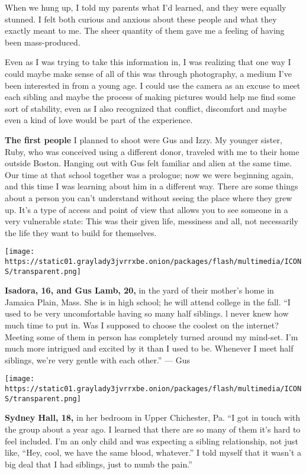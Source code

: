 When we hung up, I told my parents what I'd learned, and they were
equally stunned. I felt both curious and anxious about these people and
what they exactly meant to me. The sheer quantity of them gave me a
feeling of having been mass-produced.

Even as I was trying to take this information in, I was realizing that
one way I could maybe make sense of all of this was through photography,
a medium I've been interested in from a young age. I could use the
camera as an excuse to meet each sibling and maybe the process of making
pictures would help me find some sort of stability, even as I also
recognized that conflict, discomfort and maybe even a kind of love would
be part of the experience.

\textbf{The first people} I planned to shoot were Gus and Izzy. My
younger sister, Ruby, who was conceived using a different donor,
traveled with me to their home outside Boston. Hanging out with Gus felt
familiar and alien at the same time. Our time at that school together
was a prologue; now we were beginning again, and this time I was
learning about him in a different way. There are some things about a
person you can't understand without seeing the place where they grew up.
It's a type of access and point of view that allows you to see someone
in a very vulnerable state: This was their given life, messiness and
all, not necessarily the life they want to build for themselves.

\texttt{[image: https://static01.graylady3jvrrxbe.onion/packages/flash/multimedia/ICONS/transparent.png]}

\textbf{Isadora, 16, and Gus Lamb, 20,} in the yard of their mother's
home in Jamaica Plain, Mass. She is in high school; he will attend
college in the fall. ``I used to be very uncomfortable having so many
half siblings. l never knew how much time to put in. Was I supposed to
choose the coolest on the internet? Meeting some of them in person has
completely turned around my mind-set. I'm much more intrigued and
excited by it than I used to be. Whenever I meet half siblings, we're
very gentle with each other.'' --- Gus

\texttt{[image: https://static01.graylady3jvrrxbe.onion/packages/flash/multimedia/ICONS/transparent.png]}

\textbf{Sydney Hall, 18,} in her bedroom in Upper Chichester, Pa. ``I
got in touch with the group about a year ago. I learned that there are
so many of them it's hard to feel included. I'm an only child and was
expecting a sibling relationship, not just like, ``Hey, cool, we have
the same blood, whatever.'' I told myself that it wasn't a big deal that
I had siblings, just to numb the pain.''

